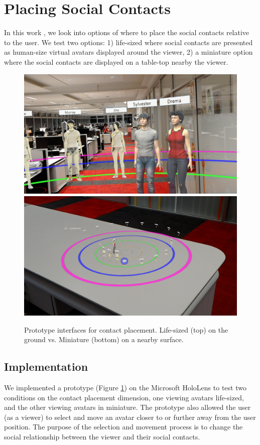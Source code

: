 \section{Placing Social Contacts}
\label{sec:contacts:placing}

In this work \cite{Nassani2017a}, we look into options of where to place the social contacts relative to the user. We test two options: 1) life-sized where social contacts are presented as human-size virtual avatars displayed around the viewer, 2) a miniature option where the social contacts are displayed on a table-top nearby the viewer. 

\begin{figure}[h]
    \centering
    \includegraphics[width=.6\linewidth]{images/ismar17/20170625_205203_HoloLens.jpg}    \includegraphics[width=.6\linewidth]{images/ismar17/20170625_205112_HoloLens.jpg}
    \caption{Prototype interfaces for contact placement. Life-sized (top) on the ground vs. Miniature (bottom) on a nearby surface.} 
    \label{fig:continuum:conditions}
\end{figure}

\subsection{Implementation}

We implemented a prototype (Figure \ref{fig:continuum:conditions}) on the Microsoft HoloLens to test two conditions on the contact placement dimension, one viewing avatars life-sized, and the other viewing avatars in miniature. The prototype also allowed the user (as a viewer) to select and move an avatar closer to or further away from the user position. The purpose of the selection and movement process is to change the social relationship between the viewer and their social contacts. 

